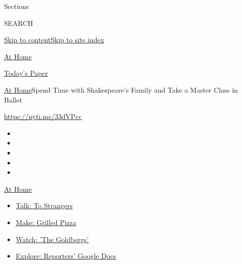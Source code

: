 Sections

SEARCH

\protect\hyperlink{site-content}{Skip to
content}\protect\hyperlink{site-index}{Skip to site index}

\href{https://www.nytimes3xbfgragh.onion/spotlight/at-home}{At Home}

\href{https://myaccount.nytimes3xbfgragh.onion/auth/login?response_type=cookie\&client_id=vi}{}

\href{https://www.nytimes3xbfgragh.onion/section/todayspaper}{Today's
Paper}

\href{/spotlight/at-home}{At Home}\textbar{}Spend Time with
Shakespeare's Family and Take a Master Class in Ballet

\url{https://nyti.ms/33dVPcc}

\begin{itemize}
\item
\item
\item
\item
\item
\end{itemize}

\href{https://www.nytimes3xbfgragh.onion/spotlight/at-home?action=click\&pgtype=Article\&state=default\&region=TOP_BANNER\&context=at_home_menu}{At
Home}

\begin{itemize}
\tightlist
\item
  \href{https://www.nytimes3xbfgragh.onion/2020/08/03/well/family/the-benefits-of-talking-to-strangers.html?action=click\&pgtype=Article\&state=default\&region=TOP_BANNER\&context=at_home_menu}{Talk:
  To Strangers}
\item
  \href{https://www.nytimes3xbfgragh.onion/2020/08/01/at-home/coronavirus-make-pizza-on-a-grill.html?action=click\&pgtype=Article\&state=default\&region=TOP_BANNER\&context=at_home_menu}{Make:
  Grilled Pizza}
\item
  \href{https://www.nytimes3xbfgragh.onion/2020/07/31/arts/television/goldbergs-abc-stream.html?action=click\&pgtype=Article\&state=default\&region=TOP_BANNER\&context=at_home_menu}{Watch:
  'The Goldbergs'}
\item
  \href{https://www.nytimes3xbfgragh.onion/interactive/2020/at-home/even-more-reporters-editors-diaries-lists-recommendations.html?action=click\&pgtype=Article\&state=default\&region=TOP_BANNER\&context=at_home_menu}{Explore:
  Reporters' Google Docs}
\end{itemize}

